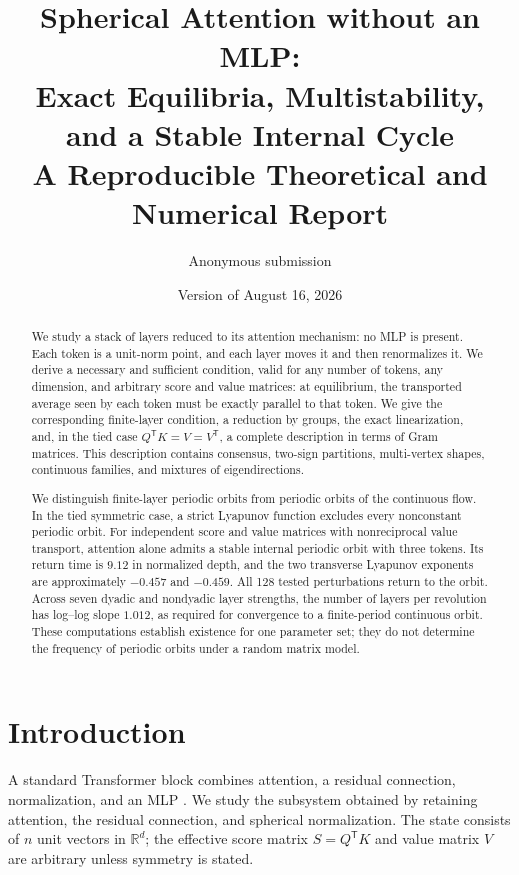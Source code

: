 \documentclass[11pt,a4paper]{article}
\title{\textbf{Spherical Attention without an MLP:\\
Exact Equilibria, Multistability, and a Stable Internal Cycle}\\[0.5em]
\large A Reproducible Theoretical and Numerical Report}
\author{Anonymous submission}
\date{Version of August 16, 2026}
\theoremstyle{definition}
\newcommand{\T}{\mathsf T}
\begin{document}
\maketitle

\begin{abstract}
We study a stack of layers reduced to its attention mechanism: no MLP is present.
Each token is a unit-norm point, and each layer moves it and then renormalizes it.
We derive a necessary and sufficient condition, valid for any number of
tokens, any dimension, and arbitrary score and value matrices: at equilibrium, the
transported average seen by each token must be exactly parallel to that token. We give
the corresponding finite-layer condition, a reduction by groups, the exact
linearization, and, in the tied case $Q^{\T}K=V=V^{\T}$, a complete description in
terms of Gram matrices. This description contains consensus, two-sign partitions,
multi-vertex shapes, continuous families, and mixtures of eigendirections.

We distinguish finite-layer periodic orbits from periodic orbits of the continuous
flow. In the tied symmetric case, a strict Lyapunov function excludes every
nonconstant periodic orbit. For independent score and value matrices with
nonreciprocal value transport, attention alone admits a stable internal periodic
orbit with three tokens. Its return time is $9.12$ in normalized depth, and the two
transverse Lyapunov exponents are approximately $-0.457$ and $-0.459$. All 128 tested
perturbations return to the orbit. Across seven dyadic and nondyadic layer strengths,
the number of layers per revolution has log--log slope $1.012$, as required for
convergence to a finite-period continuous orbit. These computations establish
existence for one parameter set; they do not determine the frequency of periodic
orbits under a random matrix model.
\end{abstract}

\clearpage
\tableofcontents
\newpage

\section{Introduction}

A standard Transformer block combines attention, a residual connection,
normalization, and an MLP \cite{vaswani2017attention}. We study the subsystem obtained
by retaining attention, the residual connection, and spherical normalization. The
state consists of $n$ unit vectors in $\mathbb R^d$; the effective score matrix
$S=Q^{\mathsf T}K$ and value matrix $V$ are arbitrary unless symmetry is stated.
\end{document}
